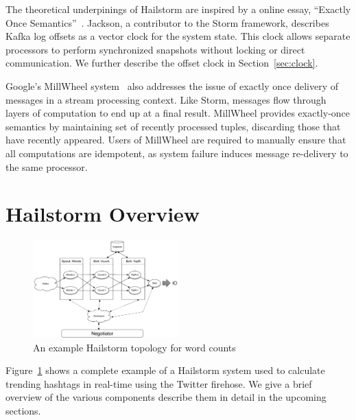 \documentclass[10pt,nocopyrightspace]{sigplanconf}
\begin{document}
The theoretical underpinings of Hailstorm are inspired by a online essay, 
``Exactly Once Semantics''~\cite{jackson2014}. Jackson, a contributor to the 
Storm framework, describes Kafka log offsets as a vector clock for the system
state. This clock allows separate processors to perform synchronized snapshots
without locking or direct communication. We further describe the offset clock 
in Section~\ref{sec:clock}.

Google's MillWheel system~\cite{millwheel} also addresses the issue of exactly
once delivery of messages in a stream processing context. Like Storm,
messages flow through layers of computation to end up at a final result.
MillWheel provides exactly-once semantics by maintaining set of recently
processed tuples, discarding those that have recently appeared. Users of
MillWheel are required to manually ensure that all computations are 
idempotent, as system failure induces message re-delivery to the same processor.

\section{Hailstorm Overview}


\begin{figure}
\centering
\includegraphics[width=0.5\textwidth]{images/architecture.pdf}
\caption{An example Hailstorm topology for word counts}
\label{fig:topology}
\end{figure}

Figure~\ref{fig:topology} shows a complete example of a Hailstorm system used
to calculate trending hashtags in real-time using the Twitter firehose. We give
a brief overview of the various components describe them in detail in the
upcoming sections.
\end{document}
